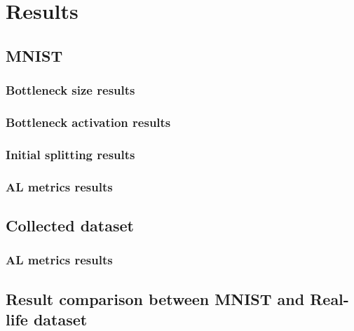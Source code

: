 \chapter{Results}
\label{chap:results}

\section{MNIST}
    \subsection{Bottleneck size results}
    \subsection{Bottleneck activation results}
    \subsection{Initial splitting results}
    \subsection{AL metrics results}
    
\section{Collected dataset}
    \subsection{AL metrics results}
    
\section{Result comparison between MNIST and Real-life dataset}